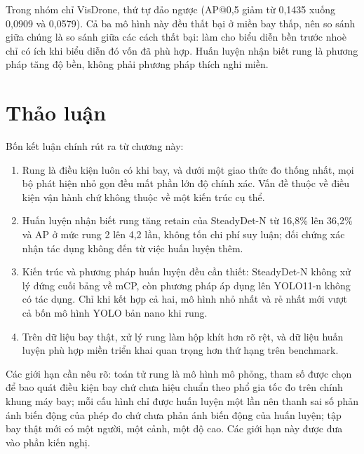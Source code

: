 Trong nhóm chỉ VisDrone, thứ tự đảo ngược (AP@0,5 giảm từ 0,1435 xuống 0,0909 và 0,0579). Cả ba mô hình này đều thất bại ở miền bay thấp, nên so sánh giữa chúng là so sánh giữa các cách thất bại: làm cho biểu diễn bền trước nhoè chỉ có ích khi biểu diễn đó vốn đã phù hợp. Huấn luyện nhận biết rung là phương pháp tăng độ bền, không phải phương pháp thích nghi miền.

\section{Thảo luận}

Bốn kết luận chính rút ra từ chương này:
\begin{enumerate}
\item Rung là điều kiện luôn có khi bay, và dưới một giao thức đo thống nhất, mọi bộ phát hiện nhỏ gọn đều mất phần lớn độ chính xác. Vấn đề thuộc về điều kiện vận hành chứ không thuộc về một kiến trúc cụ thể.
\item Huấn luyện nhận biết rung tăng retain của SteadyDet-N từ 16,8\% lên 36,2\% và AP ở mức rung 2 lên 4,2 lần, không tốn chi phí suy luận; đối chứng xác nhận tác dụng không đến từ việc huấn luyện thêm.
\item Kiến trúc và phương pháp huấn luyện đều cần thiết: SteadyDet-N không xử lý đứng cuối bảng về mCP, còn phương pháp áp dụng lên YOLO11-n không có tác dụng. Chỉ khi kết hợp cả hai, mô hình nhỏ nhất và rẻ nhất mới vượt cả bốn mô hình YOLO bản nano khi rung.
\item Trên dữ liệu bay thật, xử lý rung làm hộp khít hơn rõ rệt, và dữ liệu huấn luyện phù hợp miền triển khai quan trọng hơn thứ hạng trên benchmark.
\end{enumerate}

Các giới hạn cần nêu rõ: toán tử rung là mô hình mô phỏng, tham số được chọn để bao quát điều kiện bay chứ chưa hiệu chuẩn theo phổ gia tốc đo trên chính khung máy bay; mỗi cấu hình chỉ được huấn luyện một lần nên thanh sai số phản ánh biến động của phép đo chứ chưa phản ánh biến động của huấn luyện; tập bay thật mới có một người, một cảnh, một độ cao. Các giới hạn này được đưa vào phần kiến nghị.
